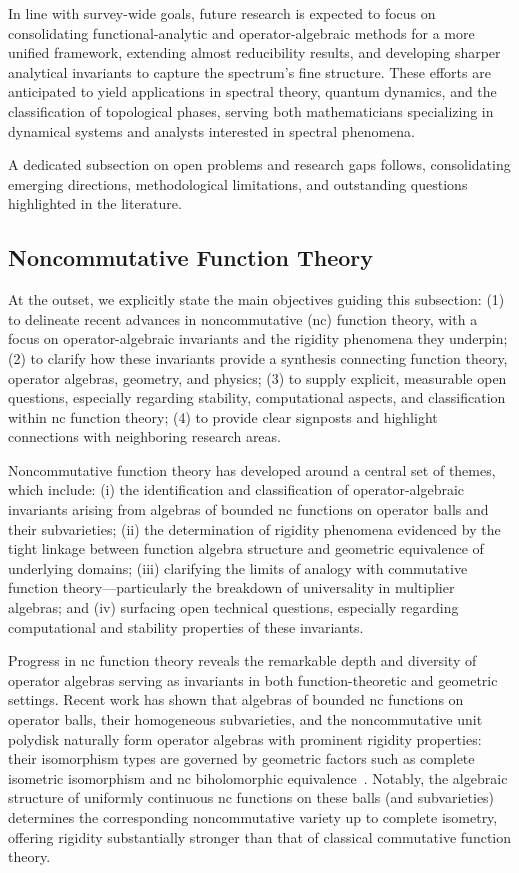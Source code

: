 \documentclass[sigconf]{acmart}
\begin{document}
In line with survey-wide goals, future research is expected to focus on consolidating functional-analytic and operator-algebraic methods for a more unified framework, extending almost reducibility results, and developing sharper analytical invariants to capture the spectrum's fine structure. These efforts are anticipated to yield applications in spectral theory, quantum dynamics, and the classification of topological phases, serving both mathematicians specializing in dynamical systems and analysts interested in spectral phenomena.

A dedicated subsection on open problems and research gaps follows, consolidating emerging directions, methodological limitations, and outstanding questions highlighted in the literature.

\subsection{Noncommutative Function Theory}

At the outset, we explicitly state the main objectives guiding this subsection: (1) to delineate recent advances in noncommutative (nc) function theory, with a focus on operator-algebraic invariants and the rigidity phenomena they underpin; (2) to clarify how these invariants provide a synthesis connecting function theory, operator algebras, geometry, and physics; (3) to supply explicit, measurable open questions, especially regarding stability, computational aspects, and classification within nc function theory; (4) to provide clear signposts and highlight connections with neighboring research areas.

Noncommutative function theory has developed around a central set of themes, which include: (i) the identification and classification of operator-algebraic invariants arising from algebras of bounded nc functions on operator balls and their subvarieties; (ii) the determination of rigidity phenomena evidenced by the tight linkage between function algebra structure and geometric equivalence of underlying domains; (iii) clarifying the limits of analogy with commutative function theory---particularly the breakdown of universality in multiplier algebras; and (iv) surfacing open technical questions, especially regarding computational and stability properties of these invariants.

Progress in nc function theory reveals the remarkable depth and diversity of operator algebras serving as invariants in both function-theoretic and geometric settings. Recent work has shown that algebras of bounded nc functions on operator balls, their homogeneous subvarieties, and the noncommutative unit polydisk naturally form operator algebras with prominent rigidity properties: their isomorphism types are governed by geometric factors such as complete isometric isomorphism and nc biholomorphic equivalence~\cite{ref98}. Notably, the algebraic structure of uniformly continuous nc functions on these balls (and subvarieties) determines the corresponding noncommutative variety up to complete isometry, offering rigidity substantially stronger than that of classical commutative function theory.
\end{document}
